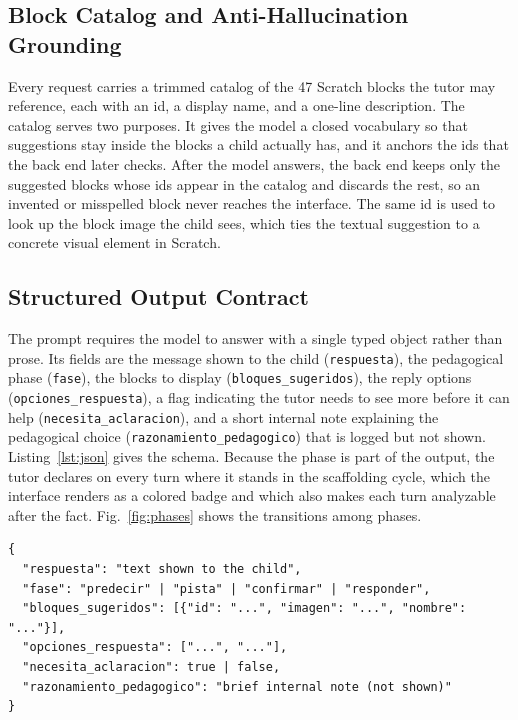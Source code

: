 \documentclass[conference]{IEEEtran}
\begin{document}
\subsection{Block Catalog and Anti-Hallucination Grounding}

Every request carries a trimmed catalog of the 47 Scratch blocks the tutor may reference, each with an id, a display name, and a one-line description. The catalog serves two purposes. It gives the model a closed vocabulary so that suggestions stay inside the blocks a child actually has, and it anchors the ids that the back end later checks. After the model answers, the back end keeps only the suggested blocks whose ids appear in the catalog and discards the rest, so an invented or misspelled block never reaches the interface. The same id is used to look up the block image the child sees, which ties the textual suggestion to a concrete visual element in Scratch.

\subsection{Structured Output Contract}

The prompt requires the model to answer with a single typed object rather than prose. Its fields are the message shown to the child (\texttt{respuesta}), the pedagogical phase (\texttt{fase}), the blocks to display (\texttt{bloques\_sugeridos}), the reply options (\texttt{opciones\_respuesta}), a flag indicating the tutor needs to see more before it can help (\texttt{necesita\_aclaracion}), and a short internal note explaining the pedagogical choice (\texttt{razonamiento\_pedagogico}) that is logged but not shown. Listing~\ref{lst:json} gives the schema. Because the phase is part of the output, the tutor declares on every turn where it stands in the scaffolding cycle, which the interface renders as a colored badge and which also makes each turn analyzable after the fact. Fig.~\ref{fig:phases} shows the transitions among phases.

\begin{lstlisting}[style=promptbox, caption={Typed reply the model must return.}, label={lst:json}]
{
  "respuesta": "text shown to the child",
  "fase": "predecir" | "pista" | "confirmar" | "responder",
  "bloques_sugeridos": [{"id": "...", "imagen": "...", "nombre": "..."}],
  "opciones_respuesta": ["...", "..."],
  "necesita_aclaracion": true | false,
  "razonamiento_pedagogico": "brief internal note (not shown)"
}
\end{lstlisting}
\end{document}
